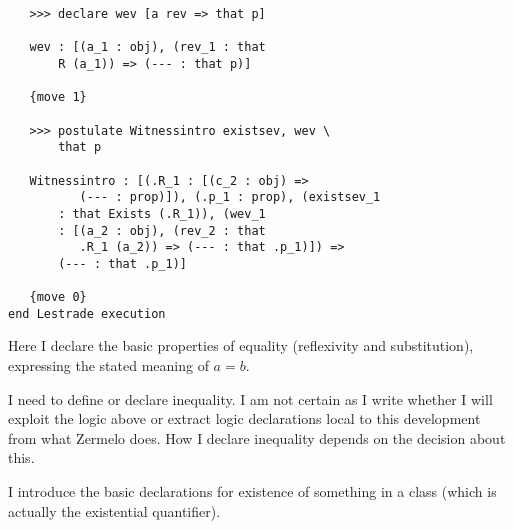 \documentclass[12pt]{article}
\begin{document}
\begin{enumerate}
\begin{verbatim}
   >>> declare wev [a rev => that p]

   wev : [(a_1 : obj), (rev_1 : that 
       R (a_1)) => (--- : that p)]

   {move 1}

   >>> postulate Witnessintro existsev, wev \
       that p

   Witnessintro : [(.R_1 : [(c_2 : obj) => 
          (--- : prop)]), (.p_1 : prop), (existsev_1 
       : that Exists (.R_1)), (wev_1 
       : [(a_2 : obj), (rev_2 : that 
          .R_1 (a_2)) => (--- : that .p_1)]) => 
       (--- : that .p_1)]

   {move 0}
end Lestrade execution

\end{verbatim}

Here I declare the basic properties of equality (reflexivity and substitution), expressing the stated meaning of $a=b$.

I need to define or declare inequality.  I am not certain as I write whether I will exploit the logic above or extract logic declarations local to this development from what Zermelo does.  How I declare inequality depends on the decision about this.

I introduce the basic declarations for existence of something in a class (which is actually the existential quantifier).



\end{enumerate}
\end{document}
